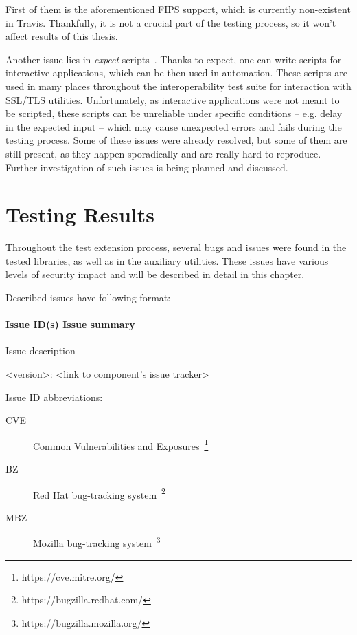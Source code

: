     First of them is the aforementioned FIPS support, which is currently
    non-existent in Travis. Thankfully, it is not a crucial part of the
    testing process, so it won't affect results of this thesis.

    Another issue lies in \textit{expect} scripts~\cite{expect-man}. Thanks to
    expect, one can write scripts for interactive applications,
    which can be then used in automation. These scripts are used in many places
    throughout the interoperability test suite for interaction with SSL/TLS
    utilities. Unfortunately, as interactive applications were not meant to
    be scripted, these scripts can be unreliable under specific conditions
    -- e.g. delay in the expected input -- which may cause unexpected errors
    and fails during the testing process. Some of these issues were already
    resolved, but some of them are still present, as they happen sporadically
    and are really hard to reproduce. Further investigation of such issues
    is being planned and discussed.


\chapter {Testing Results} \label{chap:testing_results}
    Throughout the test extension process, several bugs and issues were found
    in the tested libraries, as well as in the auxiliary utilities. These
    issues have various levels of security impact and will be described in
    detail in this chapter.

    \bigskip\noindent Described issues have following format:

    \subsubsection*{Issue ID(s)  \newline Issue summary}
    Issue description

    \medskip\noindent <version>: <link to component's issue tracker>

    \bigskip\noindent Issue ID abbreviations:
    \begin{description}
        \item[CVE] Common Vulnerabilities and Exposures~\footnote{https://cve.mitre.org/}
        \item[BZ] Red Hat bug-tracking system~\footnote{https://bugzilla.redhat.com/}
        \item[MBZ] Mozilla bug-tracking system~\footnote{https://bugzilla.mozilla.org/}
    \end{description}

